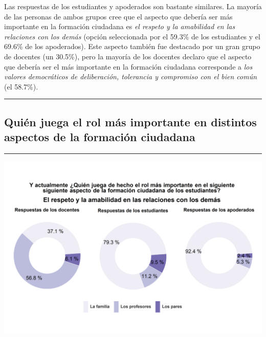 \documentclass[
  14pt,
]{book}
\let\origfigure\figure
\let\endorigfigure\endfigure
\renewenvironment{figure}[1][2] {
  \expandafter\origfigure\expandafter[H]
} {
  \endorigfigure
}
\begin{document}
Las respuestas de los estudiantes y apoderados son bastante similares. La mayoría de las personas de ambos grupos cree que el aspecto que debería ser más importante en la formación ciudadana es \emph{el respeto y la amabilidad en las relaciones con los demás} (opción seleccionada por el 59.3\% de los estudiantes y el 69.6\% de los apoderados). Este aspecto también fue destacado por un gran grupo de docentes (un 30.5\%), pero la mayoría de los docentes declaro que el aspecto que debería ser el más importante en la formación ciudadana corresponde a \emph{los valores democráticos de deliberación, tolerancia y compromiso con el bien común} (el 58.7\%).

\begin{center}\rule{0.5\linewidth}{0.5pt}\end{center}

\hypertarget{quiuxe9n-juega-el-rol-muxe1s-importante-en-distintos-aspectos-de-la-formaciuxf3n-ciudadana}{%
\subsection{Quién juega el rol más importante en distintos aspectos de la formación ciudadana}\label{quiuxe9n-juega-el-rol-muxe1s-importante-en-distintos-aspectos-de-la-formaciuxf3n-ciudadana}}

\begin{center}\rule{0.5\linewidth}{0.5pt}\end{center}

\begin{figure}[!ht]

{\centering \includegraphics[width=0.8\linewidth,]{images/graph_for_ciud7} 

}

\caption{Quién juega el rol más importante en el respeto en las relaciones con los demás}\label{fig:unnamed-chunk-31}
\end{figure}
\end{document}
